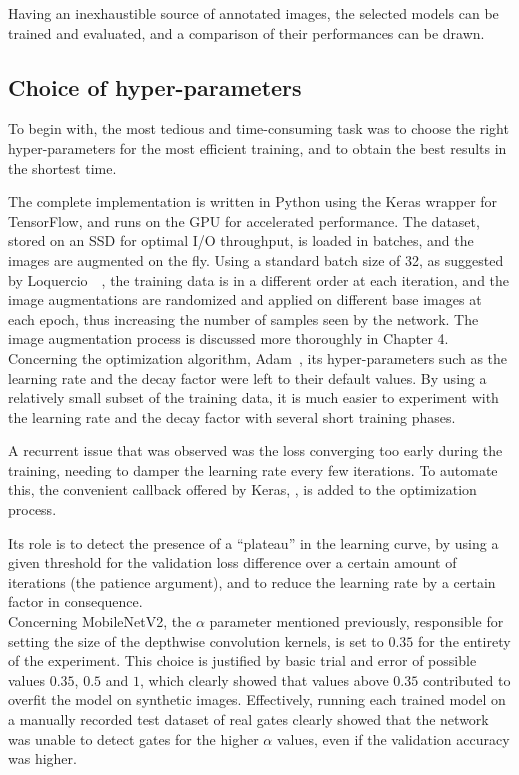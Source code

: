 Having an inexhaustible source of annotated images, the selected models can be
trained and evaluated, and a comparison of their performances can be drawn.

\subsection{Choice of hyper-parameters}

To begin with, the most tedious and time-consuming task was to choose the right
hyper-parameters for the most efficient training, and to obtain the best
results in the shortest time.

The complete implementation is written in Python using the Keras wrapper for
TensorFlow, and runs on the GPU for accelerated performance. The dataset,
stored on an SSD for optimal I/O throughput, is loaded in batches, and the
images are augmented on the fly. Using a standard batch size of 32, as suggested
by Loquercio~\etal~\cite{dronet}, the training data is in a different order at
each iteration, and the image augmentations are randomized and applied on
different base images at each epoch, thus increasing the number of samples seen
by the network. The image augmentation process is discussed more thoroughly in
Chapter 4.\\

Concerning the optimization algorithm, Adam~\cite{Adam}, its hyper-parameters
such as the learning rate and the decay factor were left to their default
values. By using a relatively small subset of the training data, it is much
easier to experiment with the learning rate and the decay factor with several
short training phases.

A recurrent issue that was observed was the loss converging too early during
the training, needing to damper the learning rate every few iterations. To
automate this, the convenient callback offered by Keras,
, is added to the optimization process.

Its role is to detect the presence of a ``plateau'' in the learning curve, by
using a given threshold for the validation loss difference over a certain
amount of iterations (the patience argument), and to reduce the learning rate
by a certain factor in consequence.\\

Concerning MobileNetV2, the $\alpha$ parameter mentioned previously, responsible
for setting the size of the depthwise convolution kernels, is set to $0.35$ for
the entirety of the experiment. This choice is justified by basic trial and
error of possible values $0.35$, $0.5$ and $1$, which clearly showed that
values above $0.35$ contributed to overfit the model on synthetic images.
Effectively, running each trained model on a manually recorded test dataset of
real gates clearly showed that the network was unable to detect gates for the
higher $\alpha$ values, even if the validation accuracy was higher.

